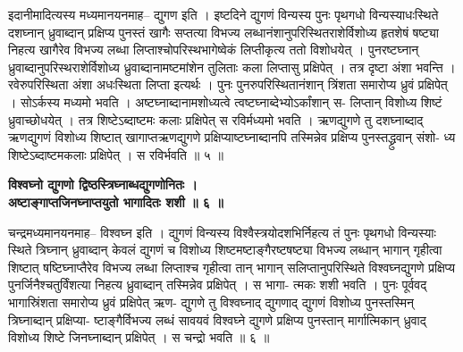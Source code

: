 \documentclass[11pt, openany]{book}
\begin{document}
{{{{\vspace{2mm}
\justifying
 इदानीमादित्यस्य मध्यमानयनमाह-- द्युगण इति । इष्टदिने द्युगणं
विन्यस्य 
पुनः पृथगधो विन्यस्याधःस्थिते दशघ्नान् ध्रुवाब्दान् प्रक्षिप्य पुनस्तं
खागैः 
सप्तत्या विभज्य लब्धानंशानुपरिस्थितराशेर्विशोध्य हृतशेषं षष्ट्या निहत्य
खागैरेव विभज्य लब्धा लिप्ताश्चोपरिस्थभागेष्वेकं लिप्तीकृत्य ततो विशोधयेत्
। पुनरष्टघ्नान् ध्रुवाब्दानुपरिस्थराशेर्विशोध्य ध्रुवाब्दानामष्टमांशेन
तुलिताः कला 
लिप्तासु प्रक्षिपेत् । तत्र दृष्टा अंशा भवन्ति । रवेरुपरिस्थिता
अंशा अधःस्थिता 
लिप्ता इत्यर्थः । पुनः पुनरुपरिस्थितानंशान् त्रिंशता समारोप्य ध्रुवं
प्रक्षिपेत् । 
सोऽर्कस्य मध्यमो भवति । अष्टघ्नाब्दानामशोध्यत्वे
त्वष्टघ्नाब्देभ्योऽर्कांशान् स-
लिप्तान् विशोध्य शिष्टं ध्रुवाच्छोधयेत् । तत्र शिष्टेऽब्दाष्टमः  कलाः
प्रक्षिपेत् 
स रविर्मध्यमो भवति । ऋणद्युगणे तु दशघ्नाब्दाद् ऋणद्युगणं विशोध्य
शिष्टात् 
खागाप्तऋणद्युगणे प्रक्षिप्याष्टघ्नाब्दानपि तस्मिन्नेव प्रक्षिप्य
पुनस्तद्ध्रुवान् संशो-
ध्य शिष्टेऽब्दाष्टमकलाः प्रक्षिपेत् । स रविर्भवति ॥ ५ ॥



\newpage

\centering
\textbf{
 विश्वघ्नो द्युगणो द्विष्ठस्त्रिघ्नाब्धद्युगणोनितः । \\
 \hspace{0.5cm}
 अष्टाङ्गाप्तजिनघ्नाप्तयुतो भागादितः शशी ॥ ६ ॥ }

\vspace{2mm}
\justifying
 चन्द्रमध्यमानयनमाह-- विश्वघ्न इति । द्युगणं विन्यस्य
विश्वैस्त्रयोदशभिर्निहत्य 
तं पुनः पृथगधो विन्यस्याः स्थिते त्रिघ्नान् ध्रुवाब्दान् केवलं द्युगणं च
विशोध्य 
शिष्टमष्टाङ्गैरष्टषष्ट्या विभज्य लब्धान् भागान् गृहीत्वा शिष्टात्
षष्टिघ्नाप्तैरेव 
विभज्य लब्धा लिप्ताश्च गृहीत्वा तान् भागान् सलिप्तानुपरिस्थिते
विश्वघ्नद्युगणे 
प्रक्षिप्य पुनर्जिनैश्चतुर्विंशत्या निहत्य ध्रुवाब्दान् तस्मिन्नेव
प्रक्षिपेत् । स भागा-
त्मकः शशी भवति । पुनः पूर्ववद् भागास्रिंशता समारोप्य ध्रुवं प्रक्षिपेत्
ऋण-
द्युगणे तु विश्वघ्नाद् द्युगणाद् द्युगणं विशोध्य पुनस्तस्मिन्
त्रिघ्नाब्दान् प्रक्षिप्या-
ष्टाङ्गैर्विभज्य लब्धं सावयवं विश्वघ्ने द्युगणे प्रक्षिप्य पुनस्तान्
मार्गात्मिकान् 
ध्रुवाद् विशोध्य शिष्टे जिनघ्नाब्दान् प्रक्षिपेत् । स चन्द्रो भवति
॥ ६ ॥ 

}}}}
\end{document}
